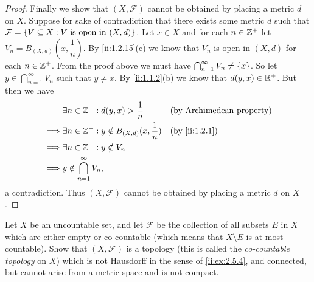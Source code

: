 \begin{proof}
  Finally we show that \((X, \mathcal{F})\) cannot be obtained by placing a metric \(d\) on \(X\).
  Suppose for sake of contradiction that there exists some metric \(d\) such that \(\mathcal{F} = \left\lbrace V \subseteq X : V \text{ is open in } (X, d)\right\rbrace\).
  Let \(x \in X\) and for each \(n \in \mathbb{Z}^+\) let \(V_n = B_{(X, d)}(x, \dfrac{1}{n})\).
  By \cref{ii:1.2.15}(c) we know that \(V_n\) is open in \((X, d)\) for each \(n \in \mathbb{Z}^+\).
  From the proof above we must have \(\bigcap_{n = 1}^\infty V_n \neq \left\lbrace x\right\rbrace\).
  So let \(y \in \bigcap_{n = 1}^\infty V_n\) such that \(y \neq x\).
  By \cref{ii:1.1.2}(b) we know that \(d(y, x) \in \mathbb{R}^+\).
  But then we have
  \begin{align*}
             & \exists n \in \Z^+ : d(y, x) > \dfrac{1}{n}               &  & \text{(by Archimedean property)} \\
    \implies & \exists n \in \Z^+ : y \notin B_{(X, d)}(x, \dfrac{1}{n}) &  & \by{ii:1.2.1}                       \\
    \implies & \exists n \in \Z^+ : y \notin V_n                                                               \\
    \implies & y \notin \bigcap_{n = 1}^\infty V_n,
  \end{align*}
  a contradiction.
  Thus \((X, \mathcal{F})\) cannot be obtained by placing a metric \(d\) on \(X\).
\end{proof}

\begin{ex}\label{ii:ex:2.5.7}
  Let \(X\) be an uncountable set, and let \(\mathcal{F}\) be the collection of all subsets \(E\) in \(X\) which are either empty or co-countable
  (which means that \(X \setminus E\) is at most countable).
  Show that \((X, \mathcal{F})\) is a topology (this is called the \emph{co-countable topology} on \(X\)) which is not Hausdorff in the sense of \cref{ii:ex:2.5.4}, and connected, but cannot arise from a metric space and is not compact.
\end{ex}

